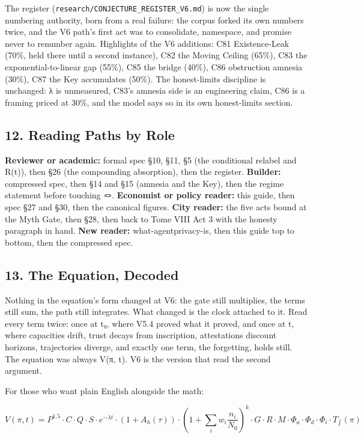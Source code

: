 \documentclass[
  11pt,
]{article}
\begin{document}
The register (\texttt{research/CONJECTURE\_REGISTER\_V6.md}) is now the
single numbering authority, born from a real failure: the corpus forked
its own numbers twice, and the V6 path's first act was to consolidate,
namespace, and promise never to renumber again. Highlights of the V6
additions: C81 Existence-Leak (70\%, held there until a second
instance), C82 the Moving Ceiling (65\%), C83 the exponential-to-linear
gap (55\%), C85 the bridge (40\%), C86 obstruction amnesia (30\%), C87
the Key accumulates (50\%). The honest-limits discipline is unchanged: λ
is unmeasured, C83's amnesia side is an engineering claim, C86 is a
framing priced at 30\%, and the model says so in its own honest-limits
section.

\subsection{12. Reading Paths by Role}\label{reading-paths-by-role}

\textbf{Reviewer or academic:} formal spec §10, §11, §5 (the conditional
relabel and R(t)), then §26 (the compounding absorption), then the
register. \textbf{Builder:} compressed spec, then §14 and §15 (amnesia
and the Key), then the regime statement before touching 🪢.
\textbf{Economist or policy reader:} this guide, then spec §27 and §30,
then the canonical figures. \textbf{City reader:} the five acts bound at
the Myth Gate, then §28, then back to Tome VIII Act 3 with the honesty
paragraph in hand. \textbf{New reader:} what-agentprivacy-is, then this
guide top to bottom, then the compressed spec.

\subsection{13. The Equation, Decoded}\label{the-equation-decoded}

Nothing in the equation's form changed at V6: the gate still multiplies,
the terms still sum, the path still integrates. What changed is the
clock attached to it. Read every term twice: once at t₀, where V5.4
proved what it proved, and once at t, where capacities drift, trust
decays from inscription, attestations discount horizons, trajectories
diverge, and exactly one term, the forgetting, holds still. The equation
was always V(π, t). V6 is the version that read the second argument.

For those who want plain English alongside the math:

\[V(\pi, t) = P^{1.5} \cdot C \cdot Q \cdot S \cdot e^{-\lambda t} \cdot (1 + A_h(\tau)) \cdot \left(1 + \sum_i w_i \frac{n_i}{N_0}\right)^k \cdot G \cdot R \cdot M \cdot \Phi_a \cdot \Phi_d \cdot \Phi_i \cdot T_{\int}(\pi)\]
\end{document}
